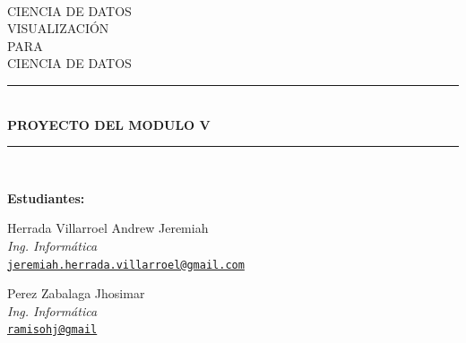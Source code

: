 \documentclass[12pt]{article}
\newcommand{\HRule}{\rule{\linewidth}{0.5mm}} %
\begin{document}
\begin{center}
    \begin{figure}
        \vspace{-1.0cm}
    \end{figure}
    \mbox{}\\[1.0cm]
    \textsc{\Huge CIENCIA DE DATOS}\\[3.0cm]
    \textsc{\LARGE VISUALIZACIÓN}\\[1.0cm]
    \textsc{\LARGE PARA}\\[1.0cm]
    \textsc{\LARGE CIENCIA DE DATOS}\\[3.0cm]
    \HRule\\[0.4cm]
    {\large \bf {PROYECTO DEL MODULO V}}\\[0.2cm]
    \HRule\\[2.0cm]
\end{center}

\begin{flushleft}
    \textbf{Estudiantes:}
\end{flushleft}

\begin{center}
    \begin{minipage}{0.5\textwidth}
        \begin{center}            
            
            \begin{center}
            Herrada Villarroel Andrew Jeremiah\\
            \textit{Ing. Informática}\\
            \href{mailto:jeremiah.herrada.villarroel@gmail.com}{\texttt{jeremiah.herrada.villarroel@gmail.com}}
            \end{center}
            
			\begin{center}
			\end{center}	            
            
            \begin{center}
            Perez Zabalaga Jhosimar\\
            \textit{Ing. Informática}\\
            \href{mailto:ramisohj@gmail}{\texttt{ramisohj@gmail}}
            \end{center}
            
            \begin{center}
			\end{center}
            
        \end{center}
    \end{minipage}%
\end{center}
\end{document}

